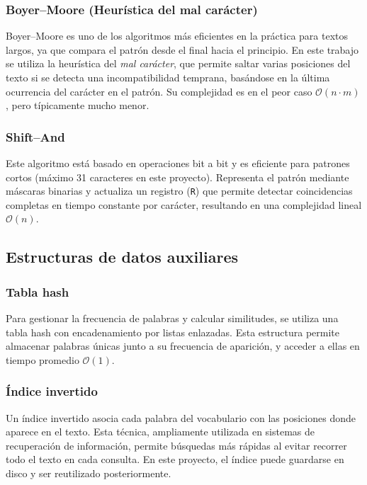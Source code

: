 \documentclass[9pt,letterpaper,onecolumn]{rho-class/rho}
\begin{document}
\subsubsection*{Boyer–Moore (Heurística del mal carácter)}

Boyer–Moore es uno de los algoritmos más eficientes en la práctica para textos largos, ya que compara el patrón desde el final hacia el principio. En este trabajo se utiliza la heurística del \textit{mal carácter}, que permite saltar varias posiciones del texto si se detecta una incompatibilidad temprana, basándose en la última ocurrencia del carácter en el patrón. Su complejidad es en el peor caso $\mathcal{O}(n \cdot m)$, pero típicamente mucho menor.

\subsubsection*{Shift–And}

Este algoritmo está basado en operaciones bit a bit y es eficiente para patrones cortos (máximo 31 caracteres en este proyecto). Representa el patrón mediante máscaras binarias y actualiza un registro (\texttt{R}) que permite detectar coincidencias completas en tiempo constante por carácter, resultando en una complejidad lineal $\mathcal{O}(n)$.

\subsection{Estructuras de datos auxiliares}

\subsubsection*{Tabla hash}

Para gestionar la frecuencia de palabras y calcular similitudes, se utiliza una tabla hash con encadenamiento por listas enlazadas. Esta estructura permite almacenar palabras únicas junto a su frecuencia de aparición, y acceder a ellas en tiempo promedio $\mathcal{O}(1)$.

\subsubsection*{Índice invertido}

Un índice invertido asocia cada palabra del vocabulario con las posiciones donde aparece en el texto. Esta técnica, ampliamente utilizada en sistemas de recuperación de información, permite búsquedas más rápidas al evitar recorrer todo el texto en cada consulta. En este proyecto, el índice puede guardarse en disco y ser reutilizado posteriormente.
\end{document}
